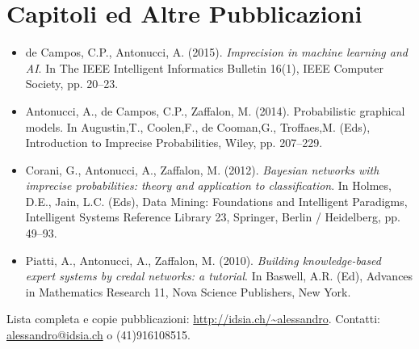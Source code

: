\documentclass[12pt,a4paper]{moderncv}
\begin{document}
\section{Capitoli ed Altre Pubblicazioni} 
\begin{itemize}
\item de Campos, C.P., Antonucci, A. (2015). \textit{Imprecision in machine learning and AI}. In The IEEE Intelligent Informatics Bulletin 16(1), IEEE Computer Society, pp. 20--23.
\item Antonucci, A., de Campos, C.P., Zaffalon, M. (2014). Probabilistic graphical models. In Augustin,T., Coolen,F., de Cooman,G., Troffaes,M. (Eds), Introduction to Imprecise Probabilities, Wiley, pp. 207--229.
\item Corani, G., Antonucci, A., Zaffalon, M. (2012). \textit{Bayesian networks with imprecise probabilities: theory and application to classification}. In Holmes, D.E., Jain, L.C. (Eds), Data Mining: Foundations and Intelligent Paradigms, Intelligent Systems Reference Library 23, Springer, Berlin / Heidelberg, pp. 49--93.
\item Piatti, A., Antonucci, A., Zaffalon, M. (2010). \textit{Building knowledge-based expert systems by credal networks: a tutorial}. In Baswell, A.R. (Ed), Advances in Mathematics Research 11, Nova Science Publishers, New York.
\end{itemize}
\vskip 10mm
Lista completa e copie pubblicazioni: \url{http://idsia.ch/~alessandro}.
\vskip 5mm
Contatti: \url{alessandro@idsia.ch} o (41)916108515.
\end{document}
